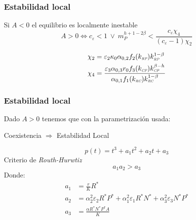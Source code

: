 \documentclass[11 pt,t]{beamer}
\newcommand{\CP}{\textit{\tiny CP}}
\newcommand{\RC}{\textit{\tiny RC}}
\newcommand{\RP}{\textit{\tiny RP}}
\begin{document}
\begin{frame}
  \frametitle{Estabilidad local}
  Si $A < 0$ el equilibrio es localmente inestable
  \pause
  \begin{equation*}
    A > 0 \iff c_\varepsilon < 1 \  \lor \  m_P^{h + 1 - 2\beta} < \frac{c_\varepsilon \chi_4}{(c_\varepsilon - 1) \chi_2}
  \end{equation*}

  \begin{equation}
    \begin{aligned}
      \chi_2 &= \varepsilon_2 \kappa_0\alpha_{0,2} f_2(k_{\RP})k_{\RP}^{1-\beta} \\
      \chi_4 &= \frac{\varepsilon_3 \alpha_{0,3}r_0 f_3(k_{\CP})k_{\CP}^{\beta - h}}{\alpha_{0,1}f_1(k_{\RC})k_{\RC}^{1-\beta}}
    \end{aligned}
  \end{equation}
\end{frame}
\begin{frame}
  \frametitle{Estabilidad local} 
  \Large  Dado $A > 0$ tenemos que con la parametrizaci\'on usada:
  \begin{center}
    Coexistencia $\Rightarrow$ Estabilidad Local
  \end{center}
  \pause
  \begin{equation*}
    p(t) = t^3 + a_1t^2 + a_2t + a_3
  \end{equation*}
  \pause
  Criterio de \textit{Routh-Hurwtiz}
  \begin{equation}
    a_1 a_2 > a_3
  \end{equation}
  \pause
  Donde:
  \begin{equation}
    \begin{aligned}
      a_1 &= \frac{r}{K}R^* \\
      a_2 &= \alpha_2^2 \varepsilon_2 R^* P^*  + \alpha_1^2 \varepsilon_1 R^* N^*  + \alpha_3^2 \varepsilon_3 N^* P^*\\
      a_3 &= \frac{\alpha R^* N^* P^* A}{K} 
    \end{aligned}
  \end{equation}

\end{frame}
\end{document}
